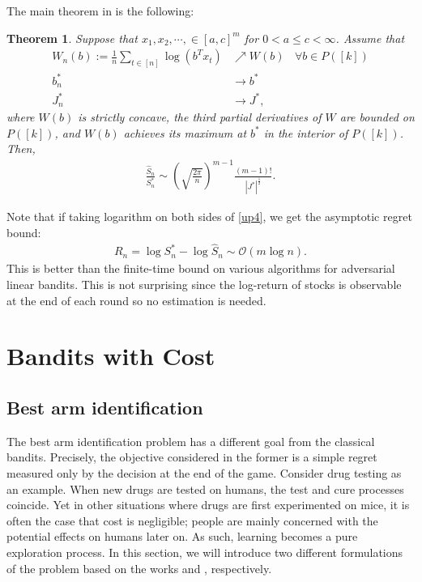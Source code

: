 \documentclass[letterpaper,10pt,openright,openany]{book}
\numberwithin{equation}{section}
\theoremstyle{plain}
\newtheorem{Th}{Theorem}[section]
\theoremstyle{definition}
\begin{document}
The main theorem in \cite{cover2011universal} is the following:
\begin{Th}
Suppose that $x_1, x_2, \cdots, \in [a, c]^m$ for $0<a\leq c<\infty$. Assume that 
\begin{align*}
W_n(b):=\frac{1}{n}\sum_{t\in [n]}\log(b^Tx_t)&\nearrow W(b)\ \ \ \ \forall b\in P([k])\\
b_n^*&\to b^*\\
J_n^*&\to J^*,
\end{align*}
where $W(b)$ is strictly concave, the third partial derivatives of $W$ are bounded on $P([k])$, and $W(b)$ achieves its maximum at $b^*$ in the interior of $P([k])$. Then,
\begin{align}
\frac{\hat{S}_n}{S_n^*}\sim\left(\sqrt{\frac{2\pi}{n}}\right)^{m-1}\frac{(m-1)!}{|J^*|^{\frac{1}{2}}}.\label{up4}
\end{align}
\end{Th}
Note that if taking logarithm on both sides of \eqref{up4}, we get the asymptotic regret bound:
\begin{align*}
R_n = \log S_n^*-\log\hat{S}_n\sim \mathcal O\left(m\log n\right). 
\end{align*}
This is better than the finite-time bound on various algorithms for adversarial linear bandits. This is not surprising since the log-return of stocks is observable at the end of each round so no estimation is needed. 


\chapter{Bandits with Cost}
\section{Best arm identification}
The best arm identification problem has a different goal from the classical bandits. Precisely, the objective considered in the former is a simple regret measured only by the decision at the end of the game. Consider drug testing as an example. When new drugs are tested on humans, the test and cure processes coincide. Yet in other situations where drugs are first experimented on mice, it is often the case that cost is negligible; people are mainly concerned with the potential effects on humans later on. As such, learning becomes a pure exploration process. In this section, we will introduce two different formulations of the problem based on the works \cite{audibert2010best,  bubeck2009pure} and \cite{garivier2016optimal}, respectively. 
\end{document}
